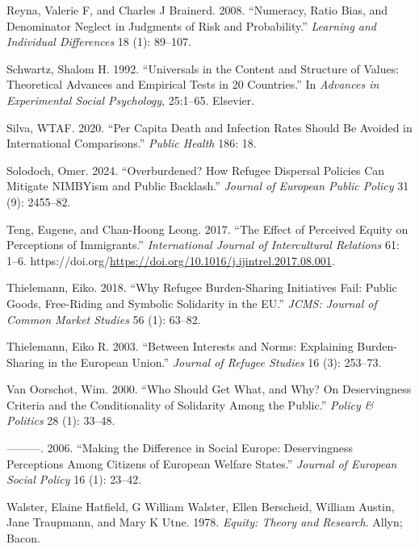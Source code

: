 \documentclass[
  12pt,
  a4paper,
]{article}
\newlength{\cslhangindent}
\newenvironment{CSLReferences}[2] %
 {\begin{list}{}{%
  \setlength{\itemindent}{0pt}
  \setlength{\leftmargin}{0pt}
  \setlength{\parsep}{0pt}
  \ifodd #1
   \setlength{\leftmargin}{\cslhangindent}
   \setlength{\itemindent}{-1\cslhangindent}
  \fi
  \setlength{\itemsep}{#2\baselineskip}}}
 {\end{list}}
\begin{document}
\begin{CSLReferences}{1}{0}
Reyna, Valerie F, and Charles J Brainerd. 2008. {``Numeracy, Ratio Bias, and Denominator Neglect in Judgments of Risk and Probability.''} \emph{Learning and Individual Differences} 18 (1): 89--107.

Schwartz, Shalom H. 1992. {``Universals in the Content and Structure of Values: Theoretical Advances and Empirical Tests in 20 Countries.''} In \emph{Advances in Experimental Social Psychology}, 25:1--65. Elsevier.

Silva, WTAF. 2020. {``Per Capita Death and Infection Rates Should Be Avoided in International Comparisons.''} \emph{Public Health} 186: 18.

Solodoch, Omer. 2024. {``Overburdened? How Refugee Dispersal Policies Can Mitigate NIMBYism and Public Backlash.''} \emph{Journal of European Public Policy} 31 (9): 2455--82.

Teng, Eugene, and Chan-Hoong Leong. 2017. {``The Effect of Perceived Equity on Perceptions of Immigrants.''} \emph{International Journal of Intercultural Relations} 61: 1--6. https://doi.org/\url{https://doi.org/10.1016/j.ijintrel.2017.08.001}.

Thielemann, Eiko. 2018. {``Why Refugee Burden-Sharing Initiatives Fail: Public Goods, Free-Riding and Symbolic Solidarity in the EU.''} \emph{JCMS: Journal of Common Market Studies} 56 (1): 63--82.

Thielemann, Eiko R. 2003. {``Between Interests and Norms: Explaining Burden-Sharing in the European Union.''} \emph{Journal of Refugee Studies} 16 (3): 253--73.

Van Oorschot, Wim. 2000. {``Who Should Get What, and Why? On Deservingness Criteria and the Conditionality of Solidarity Among the Public.''} \emph{Policy \& Politics} 28 (1): 33--48.

---------. 2006. {``Making the Difference in Social Europe: Deservingness Perceptions Among Citizens of European Welfare States.''} \emph{Journal of European Social Policy} 16 (1): 23--42.

Walster, Elaine Hatfield, G William Walster, Ellen Berscheid, William Austin, Jane Traupmann, and Mary K Utne. 1978. \emph{Equity: Theory and Research}. Allyn; Bacon.

\end{CSLReferences}
\end{document}
